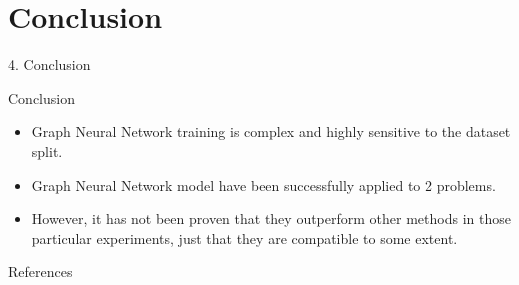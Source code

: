 \documentclass[xcolor=table]{beamer}
\begin{document}
\section{Conclusion}
\begin{frame}{ }
\huge{4. Conclusion}
\end{frame}




\begin{frame}{Conclusion}%

\begin{itemize}
    \item Graph Neural Network training is complex and highly sensitive to the dataset split.
    \item Graph Neural Network model have been successfully applied to 2 problems. 
    \item However, it has not been proven that they outperform other methods in those particular experiments, just that they are compatible to some extent. %
   

\end{itemize}

\end{frame}



\begin{frame}[allowframebreaks]{References}





\end{frame}
\end{document}
